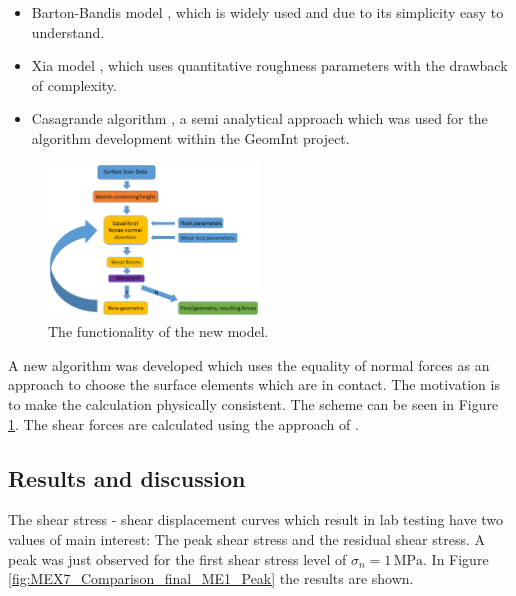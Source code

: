 \begin{itemize}
\item Barton-Bandis model \cite{BartonBandis1985}, which is widely used and due to its simplicity easy to understand.
\item Xia model \cite{Xia2014}, which uses quantitative roughness parameters with the drawback of complexity.
\item Casagrande algorithm \cite{Casagrande2017}, a semi analytical approach which was used for the algorithm development within the GeomInt project.
\end{itemize}

\begin{figure}[!ht]
\begin{center}
\includegraphics[width=0.5\textwidth]{./figures/MEX7_Scheme.png}
\end{center}
\caption{The functionality of the new model.}
\label{fig:MEX7_calculationScheme}
\end{figure}

A new algorithm was developed which uses the equality of normal forces as an approach to choose the surface elements which are in contact. The motivation is to make the calculation physically consistent. The scheme can be seen in Figure \ref{fig:MEX7_calculationScheme}. The shear forces are calculated using the approach of \cite{Casagrande2017}.
\subsection{Results and discussion}
The shear stress - shear displacement curves which result in lab testing have two values of main interest: The peak shear stress and the residual shear stress. A peak was just observed for the first shear stress level of $\sigma_n=1\,\text{MPa}$. In Figure \ref{fig:MEX7_Comparison_final_ME1_Peak} the results are shown. 

